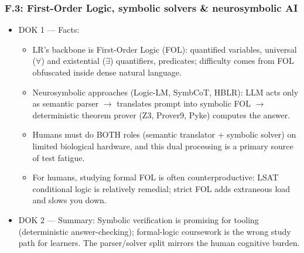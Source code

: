 \documentclass[11pt]{article}
\begin{document}
\subsubsection*{F.3: First-Order Logic, symbolic solvers \& neurosymbolic AI}
\begin{itemize}
\item DOK 1 --- Facts:
\begin{itemize}
\item LR's backbone is First-Order Logic (FOL): quantified variables, universal ($\forall$) and existential ($\exists$) quantifiers, predicates; difficulty comes from FOL obfuscated inside dense natural language.
\item Neurosymbolic approaches (Logic-LM, SymbCoT, HBLR): LLM acts only as semantic parser $\rightarrow$ translates prompt into symbolic FOL $\rightarrow$ deterministic theorem prover (Z3, Prover9, Pyke) computes the answer.
\item Humans must do BOTH roles (semantic translator + symbolic solver) on limited biological hardware, and this dual processing is a primary source of test fatigue.
\item For humans, studying formal FOL is often counterproductive: LSAT conditional logic is relatively remedial; strict FOL adds extraneous load and slows you down.
\end{itemize}
\item DOK 2 --- Summary: Symbolic verification is promising for tooling (deterministic answer-checking); formal-logic coursework is the wrong study path for learners. The parser/solver split mirrors the human cognitive burden.
\end{itemize}
\end{document}
